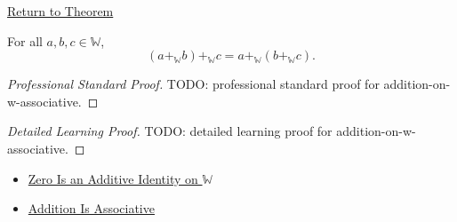 \newpage
{}
\label{prf:addition-on-w-associative}

\begin{remark*}[Return]
\hyperref[thm:addition-on-w-associative]{Return to Theorem}
\end{remark*}

\begin{theorem*}
For all $a,b,c\in\mathbb{W}$,
\[
(a+_{\mathbb{W}}b)+_{\mathbb{W}}c
=
a+_{\mathbb{W}}(b+_{\mathbb{W}}c).
\]
\end{theorem*}

\begin{proof}[Professional Standard Proof]
\LRAProofBodyStart
TODO: professional standard proof for addition-on-w-associative.
\end{proof}

\begin{proof}[Detailed Learning Proof]
\LRAProofBodyStart
TODO: detailed learning proof for addition-on-w-associative.
\end{proof}

\begin{remark*}
\end{remark*}

\begin{dependencies}
\begin{itemize}
  \item \hyperref[thm:zero-additive-identity-on-w]{Zero Is an Additive Identity on $\mathbb{W}$}
  \item \hyperref[thm:addition-associative]{Addition Is Associative}
\end{itemize}
\end{dependencies}

\clearpage
